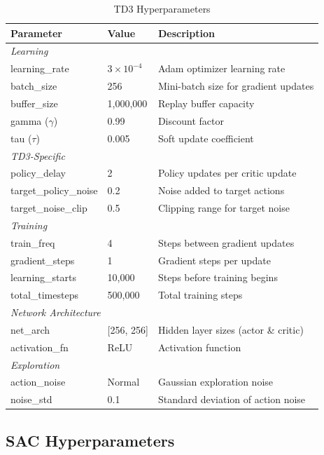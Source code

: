 \documentclass[11pt,a4paper]{article}
\begin{document}
\begin{table}[H]
\centering
\caption{TD3 Hyperparameters}
\label{tab:td3-params}
\begin{tabular}{lll}
\toprule
\textbf{Parameter} & \textbf{Value} & \textbf{Description} \\
\midrule
\multicolumn{3}{l}{\textit{Learning}} \\
learning\_rate & $3 \times 10^{-4}$ & Adam optimizer learning rate \\
batch\_size & 256 & Mini-batch size for gradient updates \\
buffer\_size & 1,000,000 & Replay buffer capacity \\
gamma ($\gamma$) & 0.99 & Discount factor \\
tau ($\tau$) & 0.005 & Soft update coefficient \\
\midrule
\multicolumn{3}{l}{\textit{TD3-Specific}} \\
policy\_delay & 2 & Policy updates per critic update \\
target\_policy\_noise & 0.2 & Noise added to target actions \\
target\_noise\_clip & 0.5 & Clipping range for target noise \\
\midrule
\multicolumn{3}{l}{\textit{Training}} \\
train\_freq & 4 & Steps between gradient updates \\
gradient\_steps & 1 & Gradient steps per update \\
learning\_starts & 10,000 & Steps before training begins \\
total\_timesteps & 500,000 & Total training steps \\
\midrule
\multicolumn{3}{l}{\textit{Network Architecture}} \\
net\_arch & [256, 256] & Hidden layer sizes (actor \& critic) \\
activation\_fn & ReLU & Activation function \\
\midrule
\multicolumn{3}{l}{\textit{Exploration}} \\
action\_noise & Normal & Gaussian exploration noise \\
noise\_std & 0.1 & Standard deviation of action noise \\
\bottomrule
\end{tabular}
\end{table}

\subsection{SAC Hyperparameters}
\end{document}
